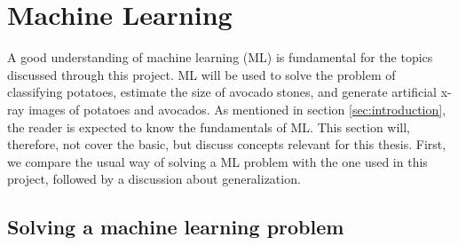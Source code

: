 \documentclass[11pt]{article}
\begin{document}
\section{Machine Learning}\label{sec:machine_learning}

A good understanding of machine learning (ML) is fundamental for the topics discussed through this project. ML will be used to solve the problem of classifying potatoes, estimate the size of avocado stones, and generate artificial x-ray images of potatoes and avocados. As mentioned in section \ref{sec:introduction}, the reader is expected to know the fundamentals of ML. This section will, therefore, not cover the basic, but discuss concepts relevant for this thesis. First, we compare the usual way of solving a ML problem with the one used in this project, followed by a discussion about generalization.


\subsection{Solving a machine learning problem}
\end{document}
